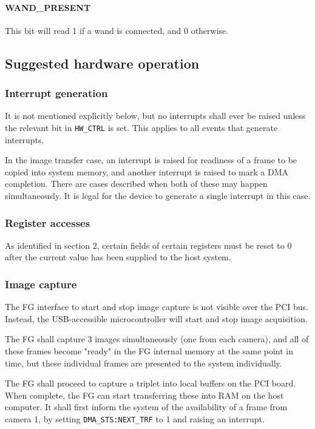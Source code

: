 \documentclass[12pt]{article}
\begin{document}
\paragraph{WAND\_PRESENT}

This bit will read 1 if a wand is connected, and 0 otherwise.

\subsection{Suggested hardware operation}

\subsubsection{Interrupt generation}

It is not mentioned explicitly below, but no interrupts shall ever be raised unless the relevant bit in \texttt{HW\_CTRL} is set. This applies to all events that generate interrupts.

In the image transfer case, an interrupt is raised for readiness of a frame to be copied into system memory, and another interrupt is raised to mark a DMA completion. There are cases described when both of these may happen simultaneously. It is legal for the device to generate a single interrupt in this case.

\subsubsection{Register accesses}

As identified in section 2, certain fields of certain registers must be reset to 0 after the current value has been supplied to the host system.

\subsubsection{Image capture}

The FG interface to start and stop image capture is not visible over the PCI bus. Instead, the USB-accessible microcontroller will start and stop image acquisition.

The FG shall capture 3 images simultaneously (one from each camera), and all of
these frames become "ready" in the FG internal memory at the same point in time, but these individual frames are presented to the system individually.

The FG shall proceed to capture a triplet into local buffers on the PCI board. When complete, the FG can start transferring these into RAM on the host computer. It shall first inform the system of the availability of a frame from camera 1, by setting \texttt{DMA\_STS:NEXT\_TRF} to 1 and raising an interrupt.
\end{document}
